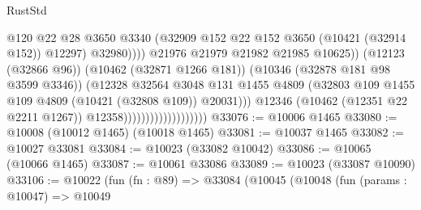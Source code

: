 \begin{lexlean}{RustStd}
\begin{coremodule}
                                                        @120
                                                        @22
                                                        @28
                                                        @3650
                                                        @3340
                                                        (@32909
                                                          @152
                                                          @22
                                                          @152
                                                          @3650
                                                          (@10421 (@32914 @152))
                                                          @12297)
                                                        @32980))))
                                                @21976
                                                @21979
                                                @21982
                                                @21985
                                                @10625))
                                            (@12123 (@32866 @96))
                                            (@10462 (@32871 @1266 @181))
                                            (@10346 (@32878 @181 @98 @3599 @3346))
                                            (@12328
                                              @32564
                                              @3048
                                              @131
                                              @1455
                                              @4809
                                              (@32803
                                                @109
                                                @1455
                                                @109
                                                @4809
                                                (@10421 (@32808 @109))
                                                @20031)))
                                          @12346
                                          (@10462 (@12351 @22 @2211 @1267))
                                          @12358)))))))))))))))))))
@33076 := @10006 @1465
@33080 := @10008 (@10012 @1465) (@10018 @1465)
@33081 := @10037 @1465
@33082 := @10027 @33081
@33084 := @10023 (@33082 @10042)
@33086 := @10065 (@10066 @1465)
@33087 := @10061 @33086
@33089 := @10023 (@33087 @10090)
@33106 := @10022
    (fun (fn : @89) =>
    @33084
      (@10045
        (@10048
          (fun (params : @10047) =>
          @10049

\end{coremodule}
\end{lexlean}
